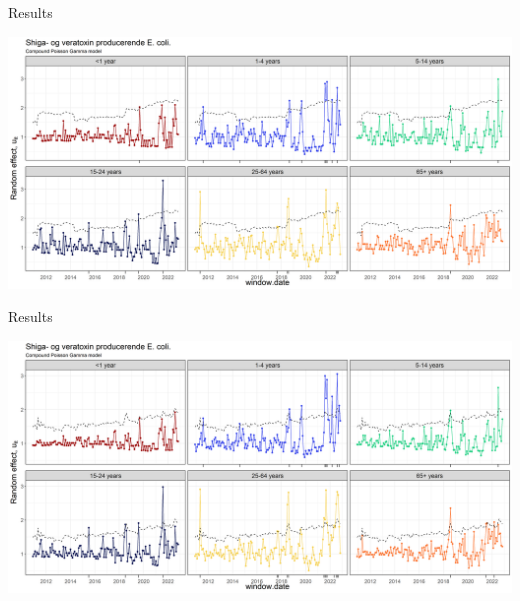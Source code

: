 \documentclass[aspectratio=169]{beamer}
\begin{document}
\begin{frame}{Results}
\protect\hypertarget{results-4}{}
\tiny

\includegraphics[width=1\linewidth]{../figures/windowedSTECPoisG}

\normalsize
\end{frame}

\begin{frame}{Results}
\protect\hypertarget{results-5}{}
\tiny

\includegraphics[width=1\linewidth]{../figures/windowedSTECPoisGExclude}

\normalsize
\end{frame}
\end{document}
